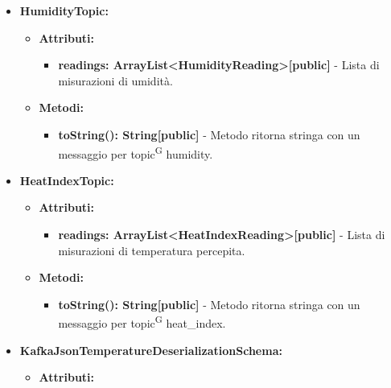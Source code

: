 \documentclass[8pt]{article}
\newcommand{\glossterm}[1]{#1\textsuperscript{G}} %
\begin{document}
\begin{itemize}
\begin{itemize}
    \end{itemize}
    \item \textbf{HumidityTopic:}
    \begin{itemize}
	\setlength\itemsep{0em}
        \item \textbf{Attributi:}
        \begin{itemize}
	\setlength\itemsep{0em}
            \item \textbf{readings: ArrayList<HumidityReading>[public]} - Lista di misurazioni di umidità.
        \end{itemize}
    \end{itemize}
    \begin{itemize}
	\setlength\itemsep{0em}
        \item \textbf{Metodi:}
        \begin{itemize}
	\setlength\itemsep{0em}
            \item \textbf{toString(): String[public]} - Metodo ritorna stringa con un messaggio per \glossterm{topic} humidity.
        \end{itemize}
    \end{itemize}
    \item \textbf{HeatIndexTopic:}
    \begin{itemize}
	\setlength\itemsep{0em}
        \item \textbf{Attributi:}
        \begin{itemize}
	\setlength\itemsep{0em}
            \item \textbf{readings: ArrayList<HeatIndexReading>[public]} - Lista di misurazioni di temperatura percepita.
        \end{itemize}
    \end{itemize}
    \begin{itemize}
	\setlength\itemsep{0em}
        \item \textbf{Metodi:}
        \begin{itemize}
	\setlength\itemsep{0em}
            \item \textbf{toString(): String[public]} - Metodo ritorna stringa con un messaggio per \glossterm{topic} heat\_index.
        \end{itemize}
    \end{itemize}
    \item \textbf{KafkaJsonTemperatureDeserializationSchema:}
    \begin{itemize}
	\setlength\itemsep{0em}
        \item \textbf{Attributi:}
        \begin{itemize}

\end{itemize}
\end{itemize}
\end{itemize}
\end{document}
